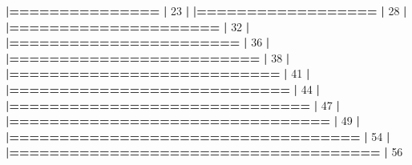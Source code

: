 \documentclass[]{book}
\newenvironment{Shaded}{\begin{snugshade}}{\end{snugshade}}
\newcommand{\DecValTok}[1]{\textcolor[rgb]{0.00,0.00,0.81}{#1}}
\newcommand{\ErrorTok}[1]{\textcolor[rgb]{0.64,0.00,0.00}{\textbf{#1}}}
\newcommand{\NormalTok}[1]{#1}
\newcommand{\OperatorTok}[1]{\textcolor[rgb]{0.81,0.36,0.00}{\textbf{#1}}}
\newcommand{\StringTok}[1]{\textcolor[rgb]{0.31,0.60,0.02}{#1}}
\begin{document}
\begin{Shaded}
\begin{Highlighting}[]
{{{{{{{{\StringTok{  }\ErrorTok{|===============}\StringTok{                                                  }\ErrorTok{|}\StringTok{  }\DecValTok{23}\NormalTok{%}
  \OperatorTok{|}\StringTok{                                                                       }
\StringTok{  }\ErrorTok{|==================}\StringTok{                                               }\ErrorTok{|}\StringTok{  }\DecValTok{28}\NormalTok{%}
  \OperatorTok{|}\StringTok{                                                                       }
\StringTok{  }\ErrorTok{|=====================}\StringTok{                                            }\ErrorTok{|}\StringTok{  }\DecValTok{32}\NormalTok{%}
  \OperatorTok{|}\StringTok{                                                                       }
\StringTok{  }\ErrorTok{|=======================}\StringTok{                                          }\ErrorTok{|}\StringTok{  }\DecValTok{36}\NormalTok{%}
  \OperatorTok{|}\StringTok{                                                                       }
\StringTok{  }\ErrorTok{|=========================}\StringTok{                                        }\ErrorTok{|}\StringTok{  }\DecValTok{38}\NormalTok{%}
  \OperatorTok{|}\StringTok{                                                                       }
\StringTok{  }\ErrorTok{|===========================}\StringTok{                                      }\ErrorTok{|}\StringTok{  }\DecValTok{41}\NormalTok{%}
  \OperatorTok{|}\StringTok{                                                                       }
\StringTok{  }\ErrorTok{|============================}\StringTok{                                     }\ErrorTok{|}\StringTok{  }\DecValTok{44}\NormalTok{%}
  \OperatorTok{|}\StringTok{                                                                       }
\StringTok{  }\ErrorTok{|==============================}\StringTok{                                   }\ErrorTok{|}\StringTok{  }\DecValTok{47}\NormalTok{%}
  \OperatorTok{|}\StringTok{                                                                       }
\StringTok{  }\ErrorTok{|================================}\StringTok{                                 }\ErrorTok{|}\StringTok{  }\DecValTok{49}\NormalTok{%}
  \OperatorTok{|}\StringTok{                                                                       }
\StringTok{  }\ErrorTok{|===================================}\StringTok{                              }\ErrorTok{|}\StringTok{  }\DecValTok{54}\NormalTok{%}
  \OperatorTok{|}\StringTok{                                                                       }
\StringTok{  }\ErrorTok{|=====================================}\StringTok{                            }\ErrorTok{|}\StringTok{  }\DecValTok{56}\NormalTok{%}
}}}}}}}}}}}}}}}}}}}
\end{Highlighting}
\end{Shaded}
\end{document}
